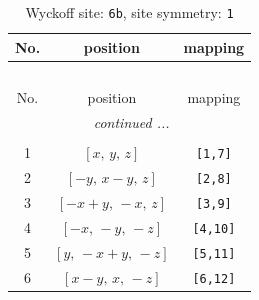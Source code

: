 \documentclass[fleqn,8pt]{jsarticle}
\begin{document}
\begin{longtable}{ccc}
\caption{Wyckoff site: {\tt 6b}, site symmetry: {\tt 1}}
 \\
 \hline \hline
No. & position & mapping \\ \hline \endfirsthead

\multicolumn{2}{l}{\tablename\ \thetable{}} \\
 \hline \hline
No. & position & mapping \\ \hline \endhead

 \hline \hline
\multicolumn{2}{r}{\footnotesize\it continued ...} \\ \endfoot

 \hline \hline
\multicolumn{2}{r}{} \\ \endlastfoot

1 & $\left[ x,\, y,\, z \right]$ & {\tt [1,7]} \\ \hline
2 & $\left[ - y,\, x - y,\, z \right]$ & {\tt [2,8]} \\ \hline
3 & $\left[ - x + y,\, - x,\, z \right]$ & {\tt [3,9]} \\ \hline
4 & $\left[ - x,\, - y,\, - z \right]$ & {\tt [4,10]} \\ \hline
5 & $\left[ y,\, - x + y,\, - z \right]$ & {\tt [5,11]} \\ \hline
6 & $\left[ x - y,\, x,\, - z \right]$ & {\tt [6,12]} \\
\end{longtable}
\end{document}
